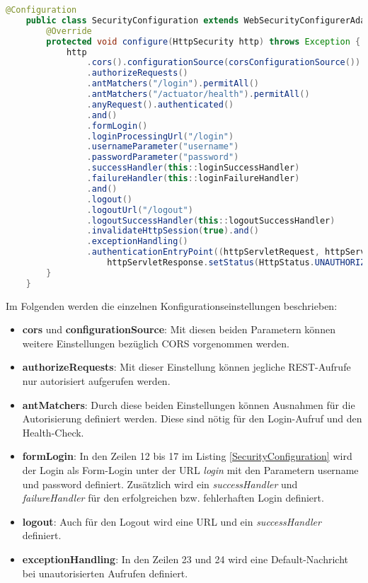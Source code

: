 \begin{lstlisting}[language=java, caption={SecurityConfiguration.java}, label=lst:SecurityConfiguration]
	@Configuration
	public class SecurityConfiguration extends WebSecurityConfigurerAdapter {
		@Override
		protected void configure(HttpSecurity http) throws Exception {
			http
				.cors().configurationSource(corsConfigurationSource()).and()
				.authorizeRequests()
				.antMatchers("/login").permitAll()
				.antMatchers("/actuator/health").permitAll()
				.anyRequest().authenticated()
				.and()
				.formLogin()
				.loginProcessingUrl("/login")
				.usernameParameter("username")
				.passwordParameter("password")
				.successHandler(this::loginSuccessHandler)
				.failureHandler(this::loginFailureHandler)
				.and()
				.logout()
				.logoutUrl("/logout") 
				.logoutSuccessHandler(this::logoutSuccessHandler)
				.invalidateHttpSession(true).and()
				.exceptionHandling()
				.authenticationEntryPoint((httpServletRequest, httpServletResponse, e) ->
					httpServletResponse.setStatus(HttpStatus.UNAUTHORIZED.value()));
		}
	}
\end{lstlisting}

Im Folgenden werden die einzelnen Konfigurationseinstellungen beschrieben:
\begin{itemize}
	\item \textbf{cors} und \textbf{configurationSource}: Mit diesen beiden Parametern können weitere Einstellungen bezüglich CORS vorgenommen werden.
	\item \textbf{authorizeRequests}: Mit dieser Einstellung können jegliche REST-Aufrufe nur autorisiert aufgerufen werden.
	\item \textbf{antMatchers}: Durch diese beiden Einstellungen können Ausnahmen für die Autorisierung definiert werden. Diese sind nötig für den Login-Aufruf und den Health-Check.
	\item \textbf{formLogin}: In den Zeilen 12 bis 17 im Listing \ref{SecurityConfiguration} wird der Login als Form-Login unter der URL \textit{login} mit den Parametern \glqq username\grqq{} und \glqq password\grqq{} definiert. Zusätzlich wird ein \textit{successHandler} und \textit{failureHandler} für den erfolgreichen bzw. fehlerhaften Login definiert.
	\item \textbf{logout}: Auch für den Logout wird eine URL und ein \textit{successHandler} definiert.
	\item \textbf{exceptionHandling}: In den Zeilen 23 und 24 wird eine Default-Nachricht bei unautorisierten Aufrufen definiert.
\end{itemize}

